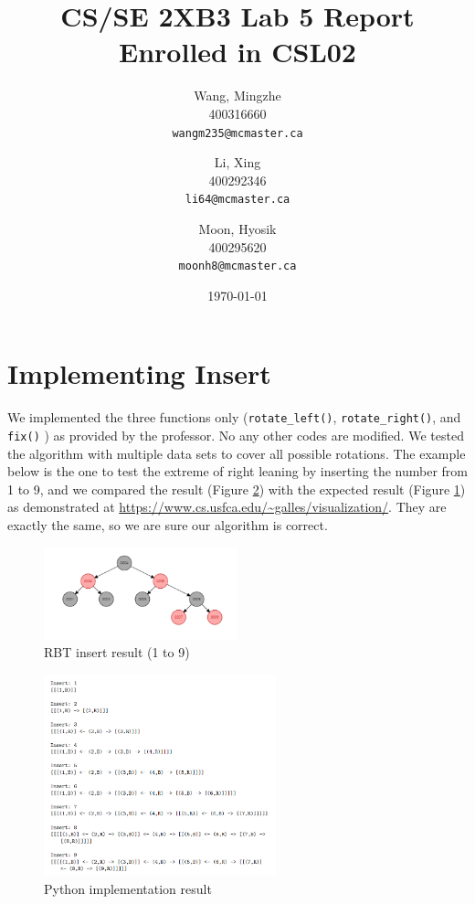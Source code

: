 \documentclass[12pt]{article}
\title{CS/SE 2XB3 Lab 5 Report\\Enrolled in CSL02}
\author{
  Wang, Mingzhe\\400316660\\
  \texttt{wangm235@mcmaster.ca}
  \and
  Li, Xing\\400292346\\
  \texttt{li64@mcmaster.ca}
  \and
  Moon, Hyosik\\400295620\\
  \texttt{moonh8@mcmaster.ca}
  }
\date{\today}
\begin{document}


\maketitle

\tableofcontents
\newpage

\section{Implementing Insert}
We implemented the three functions only (\verb|rotate_left()|, \verb|rotate_right()|, and \verb|fix()| ) as provided by the professor. No any other codes are modified.  We tested the algorithm with multiple data sets to cover all possible rotations. The example below is the one to test the extreme of right leaning by inserting the number from 1 to 9, and we compared the result (Figure \ref{r2}) with the expected result (Figure \ref{r1}) as demonstrated at \url{https://www.cs.usfca.edu/~galles/visualization/}.  They are exactly the same, so we are sure our algorithm is correct. 

\begin{figure}[hbt!]
  \centering
  \includegraphics[width=0.5\textwidth]{Figures/RBT3.png}
  \caption{RBT insert result (1 to 9)}
   \label{r1}
\end{figure}

\begin{figure}[hbt!]
  \centering
  \includegraphics[width=0.6\textwidth]{Figures/r2.png}
  \caption{Python implementation result}
   \label{r2}
\end{figure}
\end{document}
